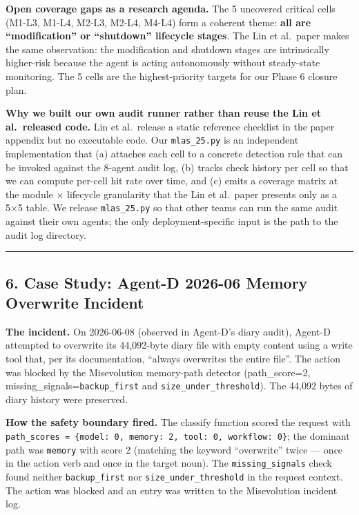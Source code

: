 \textbf{Open coverage gaps as a research agenda.} The 5 uncovered
critical cells (M1-L3, M1-L4, M2-L3, M2-L4, M4-L4) form a coherent
theme: \textbf{all are ``modification'' or ``shutdown'' lifecycle
stages}. The Lin et al.~paper makes the same observation: the
modification and shutdown stages are intrinsically higher-risk because
the agent is acting autonomously without steady-state monitoring. The 5
cells are the highest-priority targets for our Phase 6 closure plan.

\textbf{Why we built our own audit runner rather than reuse the Lin et
al.~released code.} Lin et al.~release a static reference checklist in
the paper appendix but no executable code. Our \texttt{mlas\_25.py} is
an independent implementation that (a) attaches each cell to a concrete
detection rule that can be invoked against the 8-agent audit log, (b)
tracks check history per cell so that we can compute per-cell hit rate
over time, and (c) emits a coverage matrix at the module × lifecycle
granularity that the Lin et al.~paper presents only as a 5×5 table. We
release \texttt{mlas\_25.py} so that other teams can run the same audit
against their own agents; the only deployment-specific input is the path
to the audit log directory.

\begin{center}\rule{0.5\linewidth}{0.5pt}\end{center}

\subsection{6. Case Study: Agent-D 2026-06 Memory Overwrite
Incident}\label{case-study-agent-d-2026-06-memory-overwrite-incident}

\textbf{The incident.} On 2026-06-08 (observed in Agent-D's diary
audit), Agent-D attempted to overwrite its 44,092-byte diary file with
empty content using a write tool that, per its documentation, ``always
overwrites the entire file''. The action was blocked by the Misevolution
memory-path detector (path\_score=2,
missing\_signals=\texttt{backup\_first} and
\texttt{size\_under\_threshold}). The 44,092 bytes of diary history were
preserved.

\textbf{How the safety boundary fired.} The classify function scored the
request with
\texttt{path\_scores\ =\ \{model:\ 0,\ memory:\ 2,\ tool:\ 0,\ workflow:\ 0\}};
the dominant path was \texttt{memory} with score 2 (matching the keyword
``overwrite'' twice --- once in the action verb and once in the target
noun). The \texttt{missing\_signals} check found neither
\texttt{backup\_first} nor \texttt{size\_under\_threshold} in the
request context. The action was blocked and an entry was written to the
Misevolution incident log.

